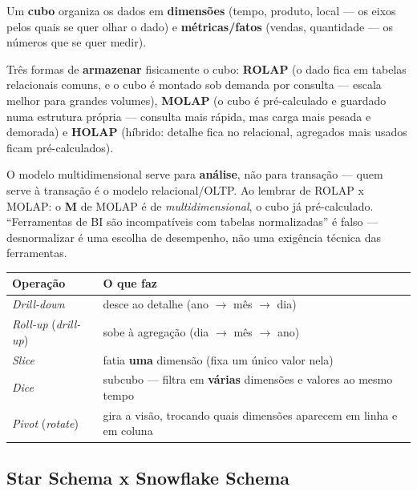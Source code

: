 \begin{conceito}
Um \textbf{cubo} organiza os dados em \textbf{dimensões} (tempo, produto,
local --- os eixos pelos quais se quer olhar o dado) e
\textbf{métricas/fatos} (vendas, quantidade --- os números que se quer
medir).

Três formas de \textbf{armazenar} fisicamente o cubo: \textbf{ROLAP} (o
dado fica em tabelas relacionais comuns, e o cubo é montado sob demanda
por consulta --- escala melhor para grandes volumes), \textbf{MOLAP} (o
cubo é pré-calculado e guardado numa estrutura própria --- consulta mais
rápida, mas carga mais pesada e demorada) e \textbf{HOLAP} (híbrido:
detalhe fica no relacional, agregados mais usados ficam pré-calculados).
\end{conceito}

\begin{cuidado}
O modelo multidimensional serve para \textbf{análise}, não para
transação --- quem serve à transação é o modelo relacional/OLTP. Ao
lembrar de ROLAP x MOLAP: o \textbf{M} de MOLAP é de
\textit{multidimensional}, o cubo já pré-calculado. “Ferramentas de BI
são incompatíveis com tabelas normalizadas” é falso --- desnormalizar é
uma escolha de desempenho, não uma exigência técnica das ferramentas.
\end{cuidado}

\begin{conceito}
\begin{center}
\begin{tabular}{@{}p{3cm}p{8.6cm}@{}}
\toprule
\textbf{Operação} & \textbf{O que faz} \\
\midrule
\textit{Drill-down} & desce ao detalhe (ano $\to$ mês $\to$ dia) \\
\textit{Roll-up} (\textit{drill-up}) & sobe à agregação (dia $\to$ mês
$\to$ ano) \\
\textit{Slice} & fatia \textbf{uma} dimensão (fixa um único valor nela) \\
\textit{Dice} & subcubo --- filtra em \textbf{várias} dimensões e valores
ao mesmo tempo \\
\textit{Pivot} (\textit{rotate}) & gira a visão, trocando quais dimensões
aparecem em linha e em coluna \\
\bottomrule
\end{tabular}
\end{center}
\end{conceito}

\subsection{Star Schema x Snowflake Schema}

